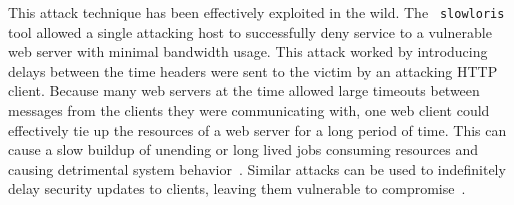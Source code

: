 This attack technique has been effectively exploited in the wild.  The {\tt 
slowloris} tool
allowed a single attacking host to successfully deny service to a vulnerable
web server with minimal bandwidth usage.  This attack worked by introducing
delays between the time headers were sent to the victim by an attacking HTTP
client.  Because many web servers at the time allowed large timeouts between
messages from the clients they were communicating with, one web client could
effectively tie up the resources of a web server for a long period of
time.
This can cause a slow buildup of unending or long
lived jobs consuming resources and causing detrimental system 
behavior~\cite{Slowloris}.  Similar attacks can be used to indefinitely 
delay security updates to clients, leaving them vulnerable to 
compromise~\cite{Cappos_TR_08}.



